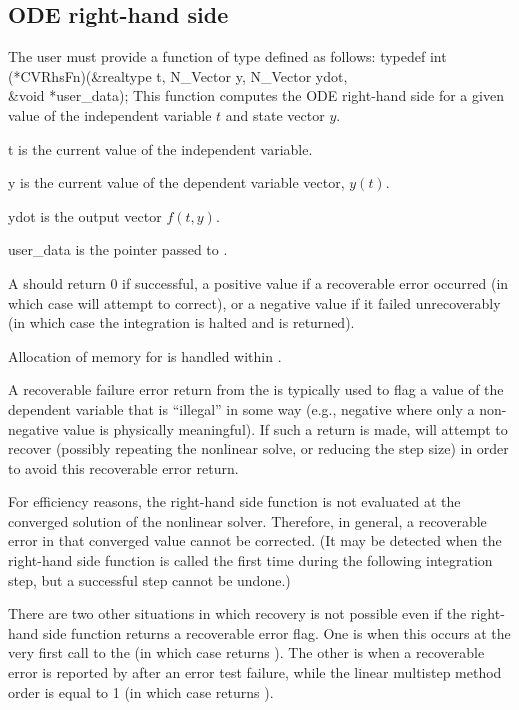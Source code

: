 \subsection{ODE right-hand side} \label{ss:rhsFn}
The user must provide a function of type  defined as follows:
{
  typedef int (*CVRhsFn)(&realtype t, N\_Vector y, N\_Vector ydot, \\
                         &void *user\_data);
}
{
  This function computes the ODE right-hand side for a given value
  of the independent variable $t$ and state vector $y$.
}
{
  \begin{args}
  \item[t]
    is the current value of the independent variable.
  \item[y]
    is the current value of the dependent variable vector, $y(t)$.
  \item[ydot]
    is the output vector $f(t,y)$.
  \item[user\_data]
    is the 
    pointer passed to .
  \end{args}
}
{
  A  should return 0 if successful, a positive value if a recoverable
  error occurred (in which case {\cvode} will attempt to correct), or a negative
  value if it failed unrecoverably (in which case the integration is halted and
   is returned).
}
{
  Allocation of memory for  is handled within {\cvode}.

  A recoverable failure error return from the  is typically used to
  flag a value of the dependent variable  that is ``illegal'' in
  some way (e.g., negative where only a non-negative value is physically
  meaningful).  If such a return is made, {\cvode} will attempt to recover
  (possibly repeating the nonlinear solve, or reducing the step size)
  in order to avoid this recoverable error return.

  For efficiency reasons, the right-hand side function is not evaluated
  at the converged solution of the nonlinear solver. Therefore, in general, a
  recoverable error in that converged value cannot be corrected.  (It may be
  detected when the right-hand side function is called the first time during
  the following integration step, but a successful step cannot be undone.)

  There are two other situations in which recovery is not possible
  even if the right-hand side function returns a recoverable error flag.
  One is when this occurs at the very first call to the 
  (in which case {\cvode} returns ).
  The other is when a recoverable error is reported by 
  after an error test failure, while the linear multistep method order is
  equal to 1 (in which case {\cvode} returns ).
}


